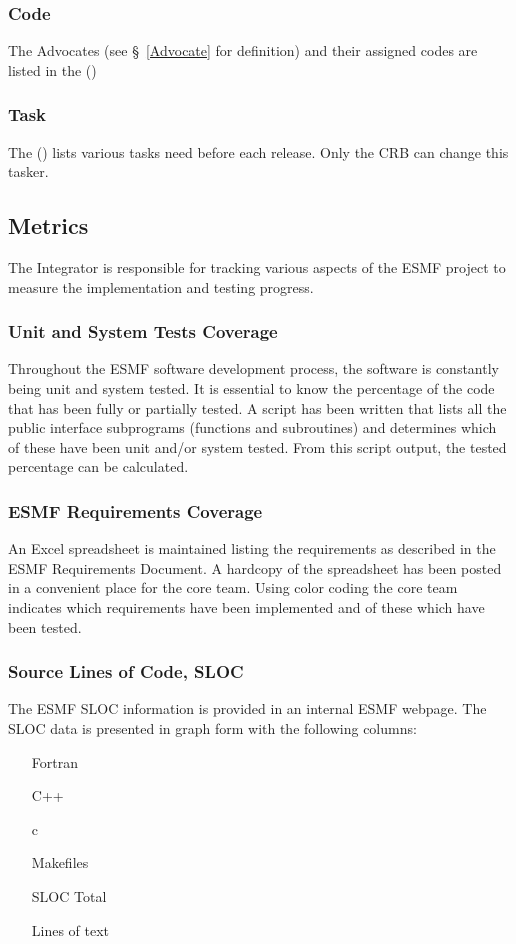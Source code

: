 \subsubsection{Code}
The Advocates (see \S~\ref{Advocate} for definition) and their assigned codes are listed
in the ()

\subsubsection{Task}
The () lists various tasks need before each release. Only the CRB can change this tasker. 


\subsection{Metrics}

The Integrator is responsible for tracking various aspects of the
ESMF project to measure the implementation and testing progress.
\subsubsection{Unit and System Tests Coverage}
Throughout the ESMF software development process, the software is constantly
being unit and system tested. It is essential to know the percentage of the
code that has been fully or partially tested. A script has been written that 
lists all the public interface subprograms (functions and subroutines) and 
determines which of these have been unit and/or system tested. From this script
output, the tested percentage can be calculated.
\subsubsection{ESMF Requirements Coverage}
An Excel spreadsheet is maintained listing the requirements as described in the
ESMF Requirements Document. A hardcopy of the spreadsheet has been posted in a
convenient place for the core team. Using color coding the core team indicates
which requirements have been implemented and of these which have been tested.
\subsubsection{Source Lines of Code, SLOC}
The ESMF SLOC information is provided in an internal ESMF webpage. The
SLOC data is presented in graph form with the following columns:
\begin{enumerate}
\item[Fortran] 
\item[C++] 
\item[c] 
\item[Makefiles] 
\item[SLOC Total] 
\item[Lines of text] 
\end{enumerate}

